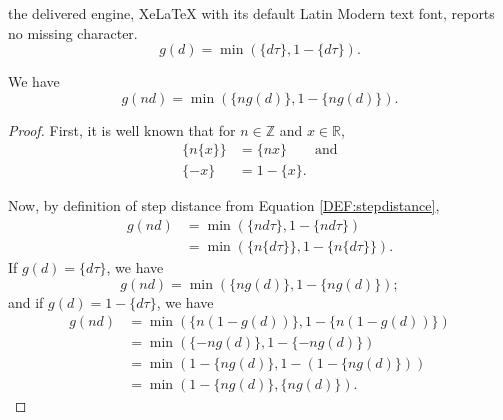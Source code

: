 \documentclass[10pt,a4paper]{amsart}
\newcommand{\R}{{\mathbb R}}
\newcommand{\Z}{{\mathbb Z}}
\begin{document}
the delivered engine, XeLaTeX with its default Latin Modern text font, reports no missing character.
\begin{equation}\label{DEF:stepdistance}
g(d)=\min\left(\{ d\tau\},1-\{ d\tau\}\right).
\end{equation}

\begin{lem}\label{LEM:ngofd}
We have \[g(nd)=\min(\{ ng(d)\},1-\{ ng(d)\}).\]
\end{lem}

\begin{proof}
First, it is well known that for $n\in\Z$ and $x\in\R$, 
\begin{align*}
\{ n\{ x\}\}&=\{ nx \}\qquad\text{and}\\
\{-x\}		&=1-\{x\}.
\end{align*}

Now, by definition of step distance from Equation \ref{DEF:stepdistance},
\begin{align*}
g(nd)&=\min(\{ nd\tau\}, 1-\{ nd\tau\})\\
     &=\min(\{ n\{ d\tau\}\}, 1-\{ n\{ d\tau\}\}).
\end{align*}
If $g(d)=\{ d\tau\}$, we have
\[g(nd)=\min(\{ ng(d)\}, 1-\{ ng(d)\});\]
and if $g(d)=1-\{ d\tau\}$, we have
\begin{align*}
g(nd)&=\min(\{ n(1-g(d))\}, 1-\{ n(1-g(d))\})\\
     &=\min(\{ -ng(d)\}, 1-\{ -ng(d)\})\\
     &=\min(1-\{ ng(d)\}, 1-(1-\{ ng(d)\}))\\
     &=\min(1-\{ ng(d)\}, \{ ng(d)\}).
\end{align*}
\end{proof}
\end{document}
